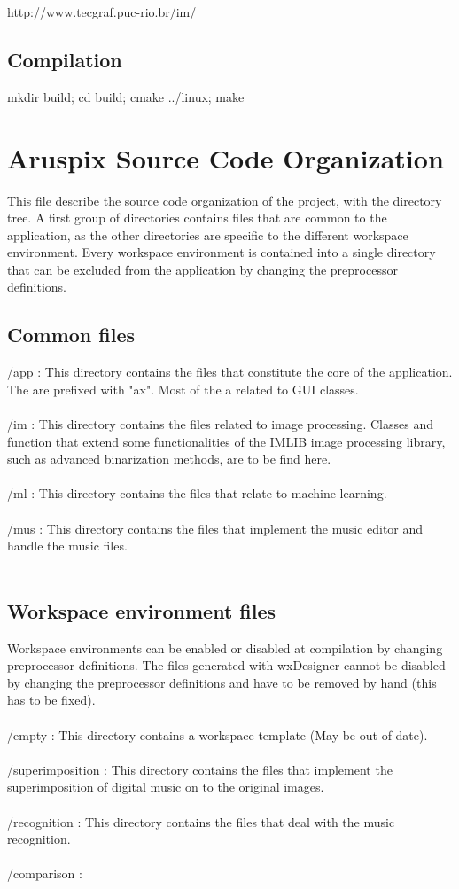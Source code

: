 \documentclass[]{article}
\begin{document}
 http://www.tecgraf.puc-rio.br/im/
\subsection{Compilation}

 mkdir build; cd build; cmake ../linux; make

\section{Aruspix Source Code Organization}

This file describe the source code organization of the project, with the directory tree.
A first group of directories contains files that are common to the application, as the
other directories are specific to the different workspace environment. Every workspace
environment is contained into a single directory that can be excluded from the application
by changing the preprocessor definitions.\\

\subsection{Common files}

/app : This directory contains the files that constitute the core of the application.
The are prefixed with "ax". Most of the a related to GUI classes.\\\\
/im : This directory contains the files related to image processing. Classes and
function that extend some functionalities of the IMLIB image processing library,
such as advanced binarization methods, are to be find here.\\\\
/ml : This directory contains the files that relate to machine learning.\\\\
/mus : This directory contains the files that implement the music editor and handle the music files.\\\\

\subsection{Workspace environment files}

Workspace environments can be enabled or disabled at compilation by changing
preprocessor definitions. The files generated with wxDesigner cannot be disabled
by changing the preprocessor definitions and have to be removed by hand (this
has to be fixed).\\\\
/empty : This directory contains a workspace template (May be out of date).\\\\ 
/superimposition : This directory contains the files that implement the superimposition
of digital music on to the original images.\\\\
/recognition : This directory contains the files that deal with the music recognition.\\\\
/comparison :
\end{document}
